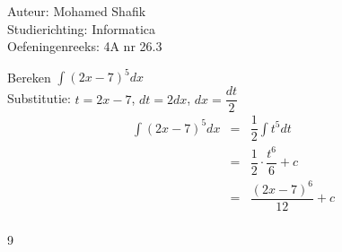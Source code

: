 \documentclass[a4paper]{article}
\begin{document}
\noindent \large Auteur: Mohamed Shafik \\
\noindent \large Studierichting: Informatica\\
\noindent \large Oefeningenreeks: 4A nr 26.3\\

\medskip

\normalsize

Bereken $\displaystyle\int (2x-7)^5 dx$\\

Substitutie: $t = 2x - 7$, $dt = 2dx$, $dx = \dfrac{dt}{2}$\\

\begin{eqnarray*}
\displaystyle\int (2x-7)^5 dx &=& \dfrac{1}{2} \displaystyle\int t^5 dt\\
&=& \dfrac{1}{2} \cdot \dfrac{t^6}{6} + c\\
&=& \dfrac{(2x-7)^6}{12} + c\\
\end{eqnarray*}

\begin{thebibliography}{9}
\end{thebibliography}
\end{document}
